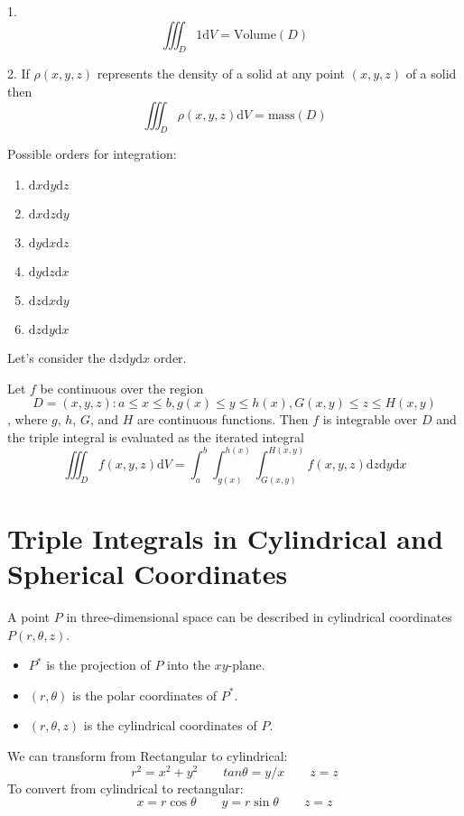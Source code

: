 \documentclass[../calc3.tex]{subfiles}
\begin{document}
1.
\[\iiint_D 1\mathrm{d}V = \text{Volume}(D)\]

2. If $\rho(x,y,z)$ represents the density of a solid at any point $(x,y,z)$ of a solid then 
\[\iiint_D \rho(x,y,z)\mathrm{d}V = \text{mass}(D)\]

Possible orders for integration:
\begin{enumerate}
    \item $\mathrm{d}x\mathrm{d}y\mathrm{d}z$
    \item $\mathrm{d}x\mathrm{d}z\mathrm{d}y$
    \item $\mathrm{d}y\mathrm{d}x\mathrm{d}z$
    \item $\mathrm{d}y\mathrm{d}z\mathrm{d}x$
    \item $\mathrm{d}z\mathrm{d}x\mathrm{d}y$
    \item $\mathrm{d}z\mathrm{d}y\mathrm{d}x$
\end{enumerate}

Let's consider the $\mathrm{d}z\mathrm{d}y\mathrm{d}x$ order.
\begin{theorem}
    Let $f$ be continuous over the region 
    \[D = {(x,y,z): a\leq x\leq b, g(x)\leq y\leq h(x), G(x,y)\leq z\leq H(x,y)}\],
    where $g$, $h$, $G$, and $H$ are continuous functions. Then $f$ is integrable over $D$ and the 
    triple integral is evaluated as the iterated integral 
    \[\iiint_D f(x,y,z)\mathrm{d}V = \int^b_a \int^{h(x)}_{g(x)}\int^{H(x,y)}_{G(x,y)}f(x,y,z)\mathrm{d}z\mathrm{d}y\mathrm{d}x\]
\end{theorem}

\section{Triple Integrals in Cylindrical and Spherical Coordinates}
A point $P$ in three-dimensional space can be described in cylindrical coordinates $P(r,\theta, z)$.
\begin{itemize}
    \item $P^*$ is the projection of $P$ into the $xy$-plane.
    \item $(r,\theta)$ is the polar coordinates of $P^*$.
    \item $(r,\theta,z)$ is the cylindrical coordinates of $P$.
\end{itemize}

We can transform from Rectangular to cylindrical:
\[r^2=x^2+y^2 \qquad tan\theta = y/x \qquad z = z\] 
To convert from cylindrical to rectangular: 
\[x = r\cos\theta \qquad y = r\sin\theta \qquad z = z\]
\end{document}
